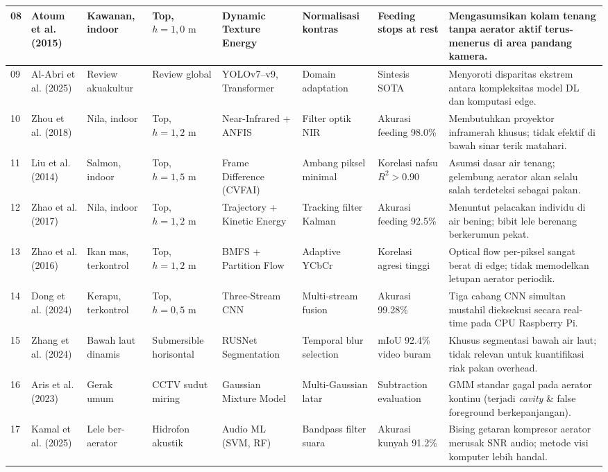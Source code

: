 \documentclass[10pt,a4paper]{article}
\providecommand{\text}[1]{\mbox{#1}}
\begin{document}
{\begin{center}
\begin{tabular}{|p{0.35cm}|p{2.2cm}|p{2.0cm}|p{1.5cm}|p{2.3cm}|p{2.0cm}|p{1.8cm}|p{4.7cm}|}
\hline
08 & Atoum et al. (2015) & Kawanan, indoor & Top, $h=1,0\text{ m}$ & Dynamic Texture Energy & Normalisasi kontras & Feeding stops at rest & Mengasumsikan kolam tenang tanpa aerator aktif terus-menerus di area pandang kamera. \\
\hline
09 & Al-Abri et al. (2025) & Review akuakultur & Review global & YOLOv7--v9, Transformer & Domain adaptation & Sintesis SOTA & Menyoroti disparitas ekstrem antara kompleksitas model DL dan komputasi edge. \\
\hline
10 & Zhou et al. (2018) & Nila, indoor & Top, $h=1,2\text{ m}$ & Near-Infrared + ANFIS & Filter optik NIR & Akurasi feeding 98.0\% & Membutuhkan proyektor inframerah khusus; tidak efektif di bawah sinar terik matahari. \\
\hline
11 & Liu et al. (2014) & Salmon, indoor & Top, $h=1,5\text{ m}$ & Frame Difference (CVFAI) & Ambang piksel minimal & Korelasi nafsu $R^2 > 0.90$ & Asumsi dasar air tenang; gelembung aerator akan selalu salah terdeteksi sebagai pakan. \\
\hline
12 & Zhao et al. (2017) & Nila, indoor & Top, $h=1,2\text{ m}$ & Trajectory + Kinetic Energy& Tracking filter Kalman & Akurasi feeding 92.5\% & Menuntut pelacakan individu di air bening; bibit lele berenang berkerumun pekat. \\
\hline
13 & Zhao et al. (2016) & Ikan mas, terkontrol & Top, $h=1,2\text{ m}$ & BMFS + Partition Flow & Adaptive YCbCr & Korelasi agresi tinggi & Optical flow per-piksel sangat berat di edge; tidak memodelkan letupan aerator periodik. \\
\hline
14 & Dong et al. (2024) & Kerapu, terkontrol & Top, $h=0,5\text{ m}$ & Three-Stream CNN & Multi-stream fusion & Akurasi 99.28\% & Tiga cabang CNN simultan mustahil dieksekusi secara real-time pada CPU Raspberry Pi. \\
\hline
15 & Zhang et al. (2024) & Bawah laut dinamis & Submersible horisontal & RUSNet Segmentation & Temporal blur selection & mIoU 92.4\% video buram & Khusus segmentasi bawah air laut; tidak relevan untuk kuantifikasi riak pakan overhead. \\
\hline
16 & Aris et al. (2023) & Gerak umum & CCTV sudut miring & Gaussian Mixture Model & Multi-Gaussian latar & Subtraction evaluation & GMM standar gagal pada aerator kontinu (terjadi \textit{cavity} \& false foreground berkepanjangan). \\
\hline
17 & Kamal et al. (2025) & Lele ber-aerator & Hidrofon akustik & Audio ML (SVM, RF) & Bandpass filter suara & Akurasi kunyah 91.2\% & Bising getaran kompresor aerator merusak SNR audio; metode visi komputer lebih handal. \\

\end{tabular}
\end{center}}
\end{document}
